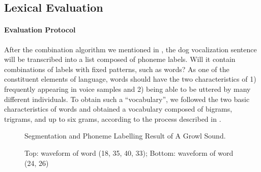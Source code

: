 \subsection{Lexical Evaluation}

\paragraph{Evaluation Protocol}

After the combination algorithm we mentioned in , the dog vocalization sentence will be transcribed into a list composed of phoneme labels. Will it contain combinations of labels with fixed patterns, such as words? 
As one of the constituent elements of language, words should have the 
two characteristics of 1) frequently appearing in voice samples and 2) being 
able to be uttered by many different individuals. 
To obtain such a ``vocabulary'', we followed the two basic characteristics of words and obtained a vocabulary composed of bigrams, trigrams, and up to six grams, according to the process described in .

\begin{figure}[h]
\centering
{}
\caption{Segmentation and Phoneme Labelling Result of A Growl Sound. }
\label{fig:cwc}
\end{figure}

\begin{figure}[th]
\centering
{}
\caption{Top: waveform of word (18, 35, 40, 33); Bottom: waveform of word (24, 26)}
\label{fig:full}
\end{figure}

